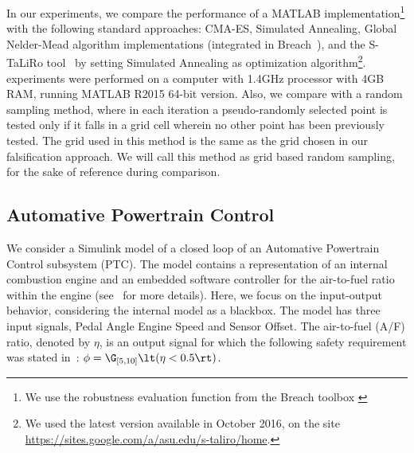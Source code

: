 

In our experiments, we compare the performance of a MATLAB
implementation\footnote{We use the robustness evaluation function from
the Breach toolbox \cite{}}
with the following standard approaches: CMA-ES, Simulated Annealing, Global
Nelder-Mead algorithm implementations (integrated in
Breach~\cite{BreachCAV10}), and the S-TaLiRo tool~\cite{TaliroLFS11}
by setting Simulated Annealing as optimization algorithm\footnote{We
used the latest version available in October 2016, on the
site \url{https://sites.google.com/a/asu.edu/s-taliro/home}.}. %
experiments were performed on a computer with 1.4GHz processor with
4GB RAM, running MATLAB R2015 64-bit version.  Also, we compare with a
random sampling method, where in each iteration a pseudo-randomly
selected point is tested only if it falls in a grid cell wherein no
other point has been previously tested.  The grid used in this method
is the same as the grid chosen in our falsification approach.  We will
call this method as grid based random sampling, for the sake of
reference during comparison.


\vspace{-1em}
\subsection{Automative Powertrain Control} \label{sec:PTC}
We consider a Simulink model of a closed loop of an Automative Powertrain Control
subsystem (PTC). The model contains a representation of an internal combustion engine and an
embedded software controller for the air-to-fuel ratio within the
engine (see~\cite{Dreossi2015} for more details). Here, we
focus on the input-output behavior, considering the
internal model as a blackbox. The model has three input signals,
Pedal Angle Engine Speed and Sensor Offset.
The air-to-fuel (A/F) ratio, denoted by $\eta$, is an
output signal for which the following safety requirement was stated
in~\cite{Dreossi2015}: $\phi = \G_{[5,10]}\lt(\eta<0.5\rt)$.

